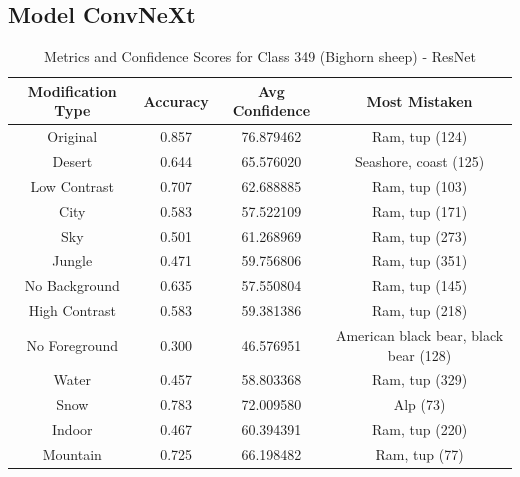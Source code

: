 \subsection*{Model ConvNeXt}



\begin{table}
	\centering
	\begin{tabular}{|c|c|c|c|}
		\hline
		\textbf{Modification Type} & \textbf{Accuracy} & \textbf{Avg Confidence} & \textbf{Most Mistaken} \\
		\hline
		Original & 0.857 & 76.879462 & Ram, tup (124) \\
		\hline
		Desert & 0.644 & 65.576020 & Seashore, coast (125) \\
		\hline
		Low Contrast & 0.707 & 62.688885 & Ram, tup (103) \\
		\hline
		City & 0.583 & 57.522109 & Ram, tup (171) \\
		\hline
		Sky & 0.501 & 61.268969 & Ram, tup (273) \\
		\hline
		Jungle & 0.471 & 59.756806 & Ram, tup (351) \\
		\hline
		No Background & 0.635 & 57.550804 & Ram, tup (145) \\
		\hline
		High Contrast & 0.583 & 59.381386 & Ram, tup (218) \\
		\hline
		No Foreground & 0.300 & 46.576951 & American black bear, black bear (128) \\
		\hline
		Water & 0.457 & 58.803368 & Ram, tup (329) \\
		\hline
		Snow & 0.783 & 72.009580 & Alp (73) \\
		\hline
		Indoor & 0.467 & 60.394391 & Ram, tup (220) \\
		\hline
		Mountain & 0.725 & 66.198482 & Ram, tup (77) \\
		\hline
	\end{tabular}
	\caption{Metrics and Confidence Scores for Class 349 (Bighorn sheep) - ResNet}
	\label{tab:metrics_confidence_class_349_resnet}
\end{table}

